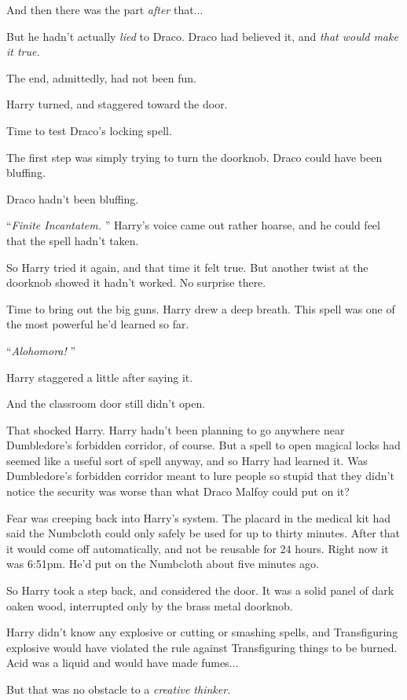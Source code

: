 And then there was the part \emph{after} that...

But he hadn't actually \emph{lied} to Draco. Draco had believed it, and
\emph{that would make it true.}

The end, admittedly, had not been fun.

Harry turned, and staggered toward the door.

Time to test Draco's locking spell.

The first step was simply trying to turn the doorknob. Draco could have
been bluffing.

Draco hadn't been bluffing.

``\emph{Finite Incantatem.} '' Harry's voice came out rather hoarse, and
he could feel that the spell hadn't taken.

So Harry tried it again, and that time it felt true. But another twist
at the doorknob showed it hadn't worked. No surprise there.

Time to bring out the big guns. Harry drew a deep breath. This spell was
one of the most powerful he'd learned so far.

``\emph{Alohomora!} ''

Harry staggered a little after saying it.

And the classroom door still didn't open.

That shocked Harry. Harry hadn't been planning to go anywhere near
Dumbledore's forbidden corridor, of course. But a spell to open magical
locks had seemed like a useful sort of spell anyway, and so Harry had
learned it. Was Dumbledore's forbidden corridor meant to lure people so
stupid that they didn't notice the security was worse than what Draco
Malfoy could put on it?

Fear was creeping back into Harry's system. The placard in the medical
kit had said the Numbcloth could only safely be used for up to thirty
minutes. After that it would come off automatically, and not be reusable
for 24 hours. Right now it was 6:51pm. He'd put on the Numbcloth about
five minutes ago.

So Harry took a step back, and considered the door. It was a solid panel
of dark oaken wood, interrupted only by the brass metal doorknob.

Harry didn't know any explosive or cutting or smashing spells, and
Transfiguring explosive would have violated the rule against
Transfiguring things to be burned. Acid was a liquid and would have made
fumes...

But that was no obstacle to a \emph{creative thinker.}

